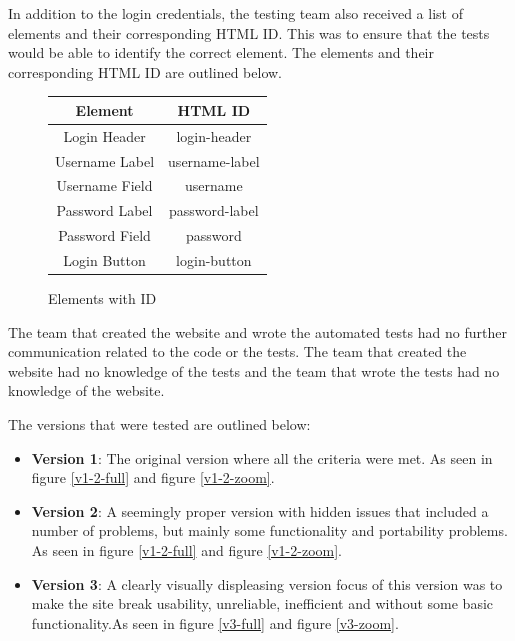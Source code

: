 \documentclass[journal,twocolumn]{IEEEtran}
\begin{document}
In addition to the login credentials, the testing team also received a list of elements and their corresponding HTML ID. This was to ensure that the tests would be able to identify the correct element. The elements and their corresponding HTML ID are outlined below.

\begin{figure}[h!]
    \centering
    \begin{tabular}{|c|c|}
        \hline
        \textbf{Element} & \textbf{HTML ID} \\ \hline
        Login Header     & login-header     \\ \hline
        Username Label   & username-label   \\ \hline
        Username Field   & username         \\ \hline
        Password Label   & password-label   \\ \hline
        Password Field   & password         \\ \hline
        Login Button     & login-button     \\ \hline
    \end{tabular}
    \captionsetup{justification=centering}
    \caption{Elements with ID}
\end{figure}

The team that created the website and wrote the automated tests had no further communication related to the code or the tests. The team that created the website had no knowledge of the tests and the team that wrote the tests had no knowledge of the website.

The versions that were tested are outlined below:
\begin{itemize}
    \item \textbf{Version 1}: The original version where all the criteria were met. As seen in figure \ref{v1-2-full} and figure \ref{v1-2-zoom}. \cite{loginV1}
    \item \textbf{Version 2}: A seemingly proper version with hidden issues that included a number of problems, but mainly some functionality and portability problems. As seen in figure \ref{v1-2-full} and figure \ref{v1-2-zoom}. \cite{loginV2}
    \item \textbf{Version 3}: A clearly visually displeasing version focus of this version was to make the site break usability, unreliable, inefficient and without some basic functionality.As seen in figure \ref{v3-full} and figure \ref{v3-zoom}. \cite{loginV3}
\end{itemize}
\end{document}
